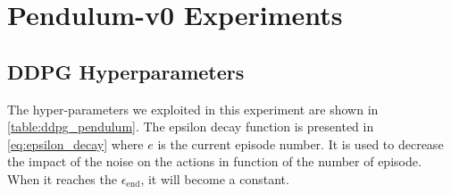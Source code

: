 \section{Pendulum-v0 Experiments} \label{sec:pendulum-exp}

\subsection{DDPG Hyperparameters}

The hyper-parameters we exploited in this experiment are shown in \vref{table:ddpg_pendulum}.
The epsilon decay function is presented in \vref{eq:epsilon_decay} where $e$ is the current episode number. It is used to decrease the impact of the noise on the actions in function of the number of episode. When it reaches the $\epsilon_{\text{end}}$, it will become a constant.

